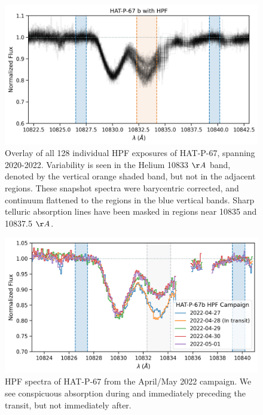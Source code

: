 \documentclass[twocolumn]{aastex631}
\begin{document}
\begin{figure}
    \includegraphics[width=\linewidth]{figures/HAT_P_67b_He_spectrum.png}
    \caption{Overlay of all 128 individual HPF exposures of HAT-P-67, spanning 2020-2022. Variability is seen in the Helium 10833 $\AA$ band, denoted by the vertical orange shaded band, but not in the adjacent regions.  These snapshot spectra were barycentric corrected, and continuum flattened to the regions in the blue vertical bands.  Sharp telluric absorption lines have been masked in regions near 10835 and 10837.5 $\AA$.}
    \label{fig:HPFheliumOverview}
\end{figure}


\begin{figure}
    \includegraphics[width=\linewidth]{figures/HAT-P-67_2022_clean.png}
    \caption{HPF spectra of HAT-P-67 from the April/May 2022 campaign.  We see conspicuous absorption during and immediately preceding the transit, but not immediately after.}
    \label{fig:HPF2022campaign}
\end{figure}
\end{document}
